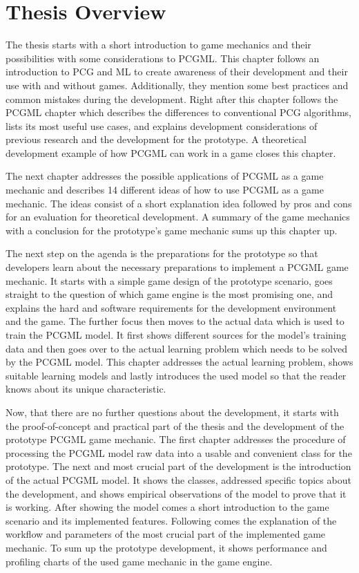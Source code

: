 \documentclass[MGS,Master,english]{twbook}%
\begin{document}
\section{Thesis Overview}
The thesis starts with a short introduction to game mechanics and their possibilities with some considerations to PCGML. This chapter follows an introduction to PCG and ML to create awareness of their development and their use with and without games. Additionally, they mention some best practices and common mistakes during the development. Right after this chapter follows the PCGML chapter which describes the differences to conventional PCG algorithms, lists its most useful use cases, and explains development considerations of previous research and the development for the prototype. A theoretical development example of how PCGML can work in a game closes this chapter.

The next chapter addresses the possible applications of PCGML as a game mechanic and describes 14 different ideas of how to use PCGML as a game mechanic. The ideas consist of a short explanation idea followed by pros and cons for an evaluation for theoretical development. A summary of the game mechanics with a conclusion for the prototype's game mechanic sums up this chapter up.

The next step on the agenda is the preparations for the prototype so that developers learn about the necessary preparations to implement a PCGML game mechanic. It starts with a simple game design of the prototype scenario, goes straight to the question of which game engine is the most promising one, and explains the hard and software requirements for the development environment and the game. The further focus then moves to the actual data which is used to train the PCGML model. It first shows different sources for the model's training data and then goes over to the actual learning problem which needs to be solved by the PCGML model. This chapter addresses the actual learning problem, shows suitable learning models and lastly introduces the used model so that the reader knows about its unique characteristic.

Now, that there are no further questions about the development, it starts with the proof-of-concept and practical part of the thesis and the development of the prototype PCGML game mechanic. The first chapter addresses the procedure of processing the PCGML model raw data into a usable and convenient class for the prototype. The next and most crucial part of the development is the introduction of the actual PCGML model. It shows the classes, addressed specific topics about the development, and shows empirical observations of the model to prove that it is working. After showing the model comes a short introduction to the game scenario and its implemented features. Following comes the explanation of the workflow and parameters of the most crucial part of the implemented game mechanic. To sum up the prototype development, it shows performance and profiling charts of the used game mechanic in the game engine.
\end{document}
